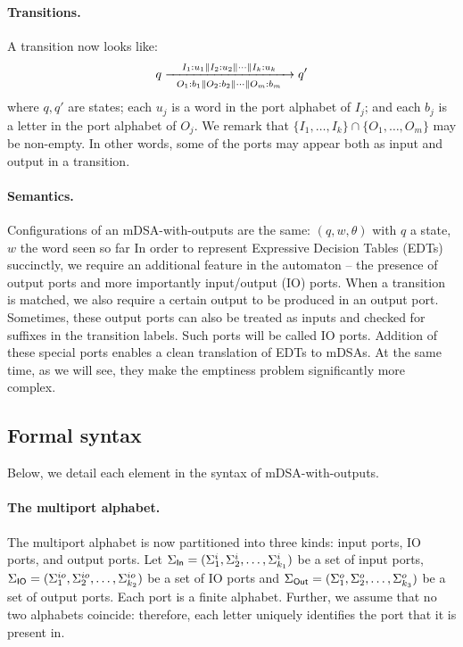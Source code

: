 \paragraph*{Transitions.} A transition now looks like:
\begin{align*}
q \xrightarrow[~~O_1: b_1 \parallel O_2: b_2 \parallel \cdots \parallel O_m: b_m~~]{I_1: u_1 \parallel I_2: u_2 \parallel \cdots \parallel I_k: u_k} q'
\end{align*}
where $q, q'$ are states; each $u_j$ is a word in the port alphabet of $I_j$; and each $b_j$ is a letter in the port alphabet of $O_j$. We remark that $\{I_1, \dots, I_k\} \cap \{O_1, \dots, O_m\}$ may be non-empty. In other words, some of the ports may appear both as input and output in a transition.  

\paragraph*{Semantics.} Configurations of an mDSA-with-outputs are the same: $(q, w, \theta)$ with $q$ a state, $w$ the word seen so far 
In order to represent Expressive Decision Tables (EDTs) succinctly, we require an additional feature in the automaton -- the presence of output ports and more importantly input/output (IO) ports. When a transition is matched, we also require a certain output to be produced in an output port. Sometimes, these output ports can also be treated as inputs and checked for suffixes in the transition labels. Such ports will be called IO ports. Addition of these special ports enables a clean translation of EDTs to mDSAs. At the same time, as we will see, they make the emptiness problem significantly more complex. 

\subsection{Formal syntax} 

Below, we detail each element in the syntax of mDSA-with-outputs.

\paragraph*{The multiport alphabet.} The multiport alphabet is now partitioned into three kinds: input ports, IO ports, and output ports. Let $\Sigma_{\mathsf{In}} = (\Sigma_1^{i}, \Sigma_2^{i}, \dots, \Sigma_{k_1}^{i})$ be a set of input ports, $\Sigma_{\mathsf{IO}} =(\Sigma_1^{io}, \Sigma_2^{io}, \dots, \Sigma_{k_2}^{io})$ be a set of IO ports and $\Sigma_{\mathsf{Out}} = (\Sigma_1^{o}, \Sigma_2^{o}, \dots, \Sigma_{k_3}^{o})$ be a set of output ports. Each port is a finite alphabet. Further, we assume that no two alphabets coincide: therefore, each letter uniquely identifies the port that it is present in. 

